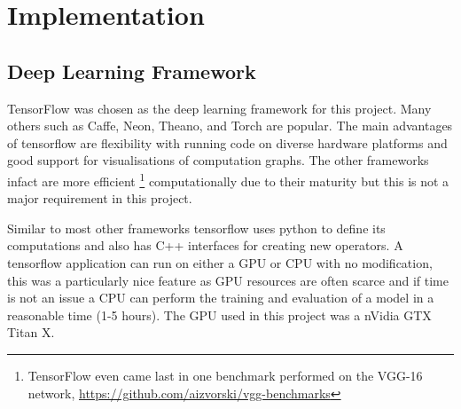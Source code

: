 \chapter{Implementation}
  \section{Deep Learning Framework}
    TensorFlow \cite{tensorflow} was chosen as the deep learning framework for this
    project. Many others such as Caffe, Neon, Theano, and Torch are popular\cite{Bahrampour2016}.
    The main advantages of tensorflow are flexibility with running code on diverse
    hardware platforms and good support for visualisations
    of computation graphs. The other frameworks infact are more efficient
    \footnote{TensorFlow even came last in one benchmark performed on the VGG-16 network, \url{https://github.com/aizvorski/vgg-benchmarks}}
    computationally due to their maturity\cite{Bahrampour2016}
    but this is not a major requirement in this project.


    Similar to most other frameworks tensorflow uses python
    to define its computations and also has C++ interfaces for creating new operators.
    A tensorflow application can run on either a GPU or CPU with no modification, this was
    a particularly nice feature as GPU resources are often scarce and if time is not an issue a CPU
    can perform the training and evaluation of a model in a reasonable time (1-5 hours). The GPU used in this project was a nVidia GTX Titan X.
